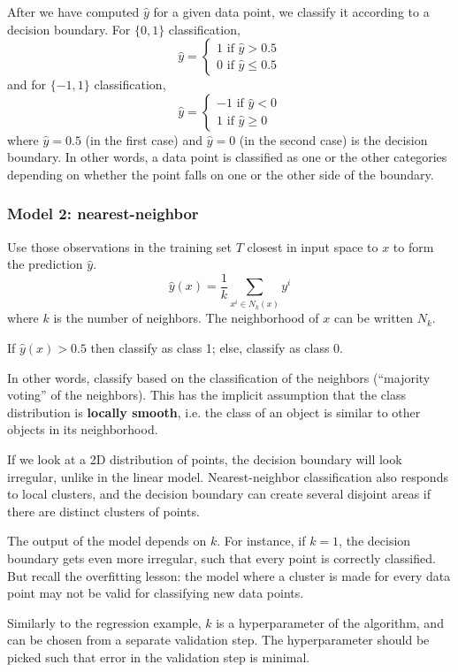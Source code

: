 \documentclass[a4paper,12pt]{article}
\begin{document}
After we have computed $\hat y$ for a given data point, we classify it according to a decision boundary. For $\{0, 1\}$ classification, 
$$\hat y = \begin{cases}
1 \text{ if } \hat y > 0.5\\
0 \text{ if } \hat y \leq 0.5
\end{cases}$$
and for $\{-1, 1\}$ classification, 
$$\hat y = \begin{cases}
-1 \text{ if } \hat y < 0\\
1 \text{ if } \hat y \geq 0
\end{cases}$$
where $\hat y = 0.5$ (in the first case) and $\hat y = 0$ (in the second case) is the decision boundary. In other words, a data point is classified as one or the other categories depending on whether the point falls on one or the other side of the boundary. 

\subsubsection{Model 2: nearest-neighbor}

Use those observations in the training set $T$ closest in input space to $x$ to form the prediction $\hat y$. 
$$\hat y(x) = \frac{1}{k} \sum_{x^i \in N_k(x)} y^i $$
where $k$ is the number of neighbors. The neighborhood of $x$ can be written $N_k$. 

If $\hat y(x) > 0.5$ then classify as class 1; else, classify as class 0. 

In other words, classify based on the classification of the neighbors (``majority voting'' of the neighbors). This has the implicit assumption that the class distribution is \textbf{locally smooth}, i.e. the class of an object is similar to other objects in its neighborhood. 

If we look at a 2D distribution of points, the decision boundary will look irregular, unlike in the linear model. Nearest-neighbor classification also responds to local clusters, and the decision boundary can create several disjoint areas if there are distinct clusters of points. 

The output of the model depends on $k$. For instance, if $k=1$, the decision boundary gets even more irregular, such that every point is correctly classified. But recall the overfitting lesson: the model where a cluster is made for every data point may not be valid for classifying new data points. 

Similarly to the regression example, $k$ is a hyperparameter of the algorithm, and can be chosen from a separate validation step. The hyperparameter should be picked such that error in the validation step is minimal. 
\end{document}
